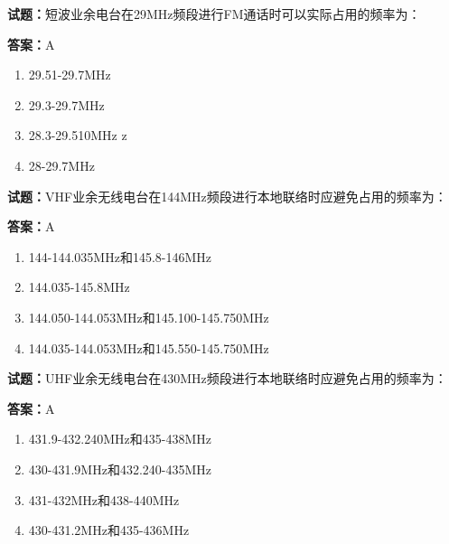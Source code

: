 \documentclass{ctexbook}
\begin{document}




\vspace{1em}

\textbf{试题：}短波业余电台在29MHz频段进行FM通话时可以实际占用的频率为： 

\textbf{答案：}A 

\begin{enumerate}[leftmargin=3em]
  \item 29.51-29.7MHz 

  \item 29.3-29.7MHz 

  \item 28.3-29.510MHz z 

  \item 28-29.7MHz 

\end{enumerate}





\vspace{1em}

\textbf{试题：}VHF业余无线电台在144MHz频段进行本地联络时应避免占用的频率为： 

\textbf{答案：}A 

\begin{enumerate}[leftmargin=3em]
  \item 144-144.035MHz和145.8-146MHz 

  \item 144.035-145.8MHz 

  \item 144.050-144.053MHz和145.100-145.750MHz 

  \item 144.035-144.053MHz和145.550-145.750MHz 

\end{enumerate}





\vspace{1em}

\textbf{试题：}UHF业余无线电台在430MHz频段进行本地联络时应避免占用的频率为： 

\textbf{答案：}A 

\begin{enumerate}[leftmargin=3em]
  \item 431.9-432.240MHz和435-438MHz 

  \item 430-431.9MHz和432.240-435MHz 

  \item 431-432MHz和438-440MHz 

  \item 430-431.2MHz和435-436MHz 

\end{enumerate}
\end{document}
